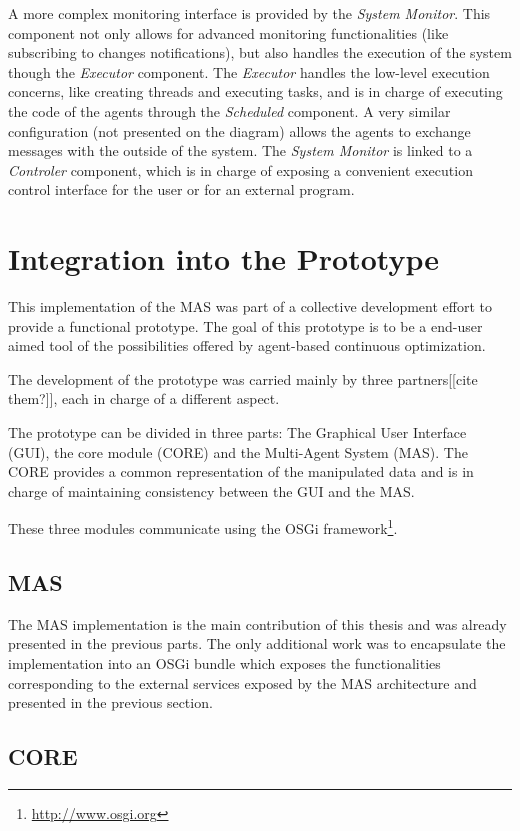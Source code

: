 A more complex monitoring interface is provided by the \emph{System Monitor}. This component not only allows for advanced monitoring functionalities (like subscribing to changes notifications), but also handles the execution of the system though the \emph{Executor} component. The \emph{Executor} handles the low-level execution concerns, like creating threads and executing tasks, and is in charge of executing the code of the agents through the \emph{Scheduled} component. A very similar configuration (not presented on the diagram) allows the agents to exchange messages with the outside of the system. The \emph{System Monitor} is linked to a \emph{Controler} component, which is in charge of exposing a convenient execution control interface for the user or for an external program.

\section{Integration into the Prototype}

This implementation of the MAS was part of a collective development effort to provide a functional prototype. The goal of this prototype is to be a end-user aimed tool of the possibilities offered by agent-based continuous optimization.

The development of the prototype was carried mainly by three partners[[cite them?]], each in charge of a different aspect.

The prototype can be divided in three parts: The Graphical User Interface (GUI), the core module (CORE) and the Multi-Agent System (MAS). The CORE provides a common representation of the manipulated data and is in charge of maintaining consistency between the GUI and the MAS.

These three modules communicate using the OSGi framework\footnote{\url{http://www.osgi.org}}.

\subsection{MAS}

The MAS implementation is the main contribution of this thesis and was already presented in the previous parts. The only additional work was to encapsulate the implementation into an OSGi bundle which exposes the functionalities corresponding to the external services exposed by the MAS architecture and presented in the previous section.

\subsection{CORE}

